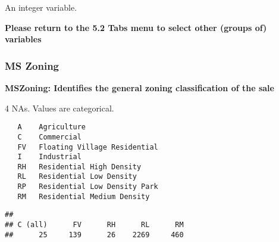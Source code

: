 \documentclass[]{article}
\newenvironment{Shaded}{\begin{snugshade}}{\end{snugshade}}
\newcommand{\KeywordTok}[1]{\textcolor[rgb]{0.13,0.29,0.53}{\textbf{#1}}}
\newcommand{\DecValTok}[1]{\textcolor[rgb]{0.00,0.00,0.81}{#1}}
\newcommand{\StringTok}[1]{\textcolor[rgb]{0.31,0.60,0.02}{#1}}
\newcommand{\CommentTok}[1]{\textcolor[rgb]{0.56,0.35,0.01}{\textit{#1}}}
\newcommand{\OperatorTok}[1]{\textcolor[rgb]{0.81,0.36,0.00}{\textbf{#1}}}
\newcommand{\NormalTok}[1]{#1}
\begin{document}
An integer variable.

\begin{Shaded}
\end{Shaded}

\textbf{Please return to the 5.2 Tabs menu to select other (groups of)
variables}

\subsubsection{MS Zoning}\label{ms-zoning}

\textbf{MSZoning: Identifies the general zoning classification of the
sale}

4 NAs. Values are categorical.

\begin{verbatim}
   A    Agriculture
   C    Commercial
   FV   Floating Village Residential
   I    Industrial
   RH   Residential High Density
   RL   Residential Low Density
   RP   Residential Low Density Park 
   RM   Residential Medium Density
\end{verbatim}

\begin{Shaded}
\end{Shaded}

\begin{verbatim}
## 
## C (all)      FV      RH      RL      RM 
##      25     139      26    2269     460
\end{verbatim}

\begin{Shaded}
\end{Shaded}
\end{document}
